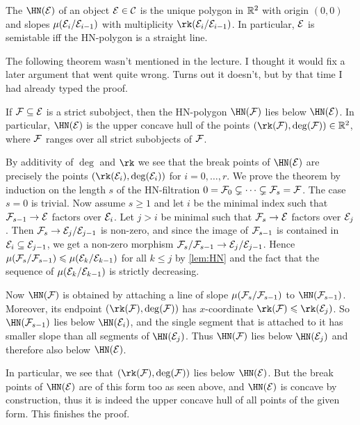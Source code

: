 \documentclass[a4paper, 10pt, oneside, DIV=9, chapterprefix=true, numbers=enddot,bibliography=totoc]{scrbook}
\begin{document}
\begin{defi}\label{def:HNPolygon}
	The  $\HN(\Ee)$ of an object $\mathcal{E}\in \mathcal{C}$ is the unique polygon in $\mathbb{R}^2$ with origin $(0,0)$ and slopes $\mu(\mathcal{E}_i/\mathcal{E}_{i-1})$ with multiplicity $\rk(\Ee_i/\Ee_{i-1})$. In particular, $\mathcal{E}$ is semistable iff the HN-polygon is a straight line.
\end{defi}
The following theorem wasn't mentioned in the lecture. I thought it would fix a later argument that went quite wrong. Turns out it doesn't, but by that time I had already typed the proof.
\begin{thm*}\label{thm*:HNPolygon}
	If $\mathcal{F}\subseteq \mathcal{E}$ is a strict subobject, then the HN-polygon $\HN(\Ff)$ lies below $\HN(\Ee)$. In particular, $\HN(\Ee)$ is the upper concave hull of the points $(\rk(\Ff),\deg(\Ff))\in \IR^2$, where $\mathcal{F}$ ranges over all strict subobjects of $\mathcal{F}$.
\end{thm*}
\begin{proof*}
	By additivity of $\deg$ and $\rk$ we see that the break points of $\HN(\Ee)$ are precisely the points $(\rk(\Ee_i),\deg(\Ee_i))$ for $i=0,\dotsc,r$. We prove the theorem by induction on the length $s$ of the HN-filtration $0=\mathcal{F}_0\subsetneq \dotsb\subsetneq \mathcal{F}_s=\mathcal{F}$. The case $s=0$ is trivial. Now assume $s\geq 1$ and let $i$ be the minimal index such that $\Ff_{s-1}\morphism \Ee$ factors over $\mathcal{E}_i$. Let $j> i$ be minimal such that $\Ff_s\morphism \Ee$ factors over $\mathcal{E}_j$. Then $\Ff_s\morphism \Ee_j/\Ee_{j-1}$ is non-zero, and since the image of $\mathcal{F}_{s-1}$ is contained in $\mathcal{E}_i\subseteq \mathcal{E}_{j-1}$, we get a non-zero morphism $\Ff_s/\Ff_{s-1}\morphism \Ee_j/\Ee_{j-1}$. Hence $\mu(\mathcal{F}_s/\mathcal{F}_{s-1})\leqslant \mu(\mathcal{E}_k/\mathcal{E}_{k-1})$ for all $k\leq j$ by \cref{lem:HN} and the fact that the sequence of $\mu(\mathcal{E}_k/\mathcal{E}_{k-1})$ is strictly decreasing.
	
	Now $\HN(\Ff)$ is obtained by attaching a line of slope $\mu(\mathcal{F}_s/\mathcal{F}_{s-1})$ to $\HN(\Ff_{s-1})$. Moreover, its endpoint $(\rk(\Ff),\deg(\Ff))$ has $x$-coordinate $\rk(\Ff)\leq \rk(\Ee_j)$. So $\HN(\Ff_{s-1})$ lies below $\HN(\Ee_i)$, and the single segment that is attached to it has smaller slope than all segments of $\HN(\Ee_j)$. Thus $\HN(\Ff)$ lies below $\HN(\Ee_j)$ and therefore also below $\HN(\Ee)$.
	
	In particular, we see that $(\rk(\Ff),\deg(\Ff))$ lies below $\HN(\Ee)$. But the break points of $\HN(\Ee)$ are of this form too as seen above, and $\HN(\Ee)$ is concave by construction, thus it is indeed the upper concave hull of all points of the given form. This finishes the proof.
\end{proof*}
\end{document}
